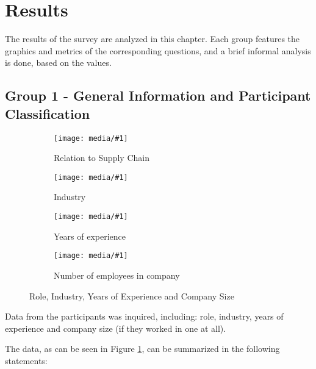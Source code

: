 
\section{Results}



The results of the survey are analyzed in this chapter. Each group features the graphics and metrics of the corresponding questions, and a brief informal analysis is done, based on the values.



\subsection{Group 1 - General Information and Participant Classification}

\newcommand{\resfig}[2]{
    \begin{subfigure}{.55\textwidth}
        \centering
        \texttt{[image: media/\#1]}
        \caption{#2}
    \end{subfigure}
}

\begin{figure}[ht]

    \resfig{sc_role}{Relation to Supply Chain}
    \resfig{sc_industry}{Industry}

    \resfig{sc_experience}{Years of experience}
    \resfig{nr_employees}{Number of employees in company}

      \caption{Role, Industry, Years of Experience and Company Size}
    \label{fig:group1_graphics}
\end{figure}


Data from the participants was inquired, including: role, industry, years of experience and company size (if  they worked in one at all).

The data, as can be seen in Figure \ref{fig:group1_graphics}, can be summarized in the following statements:



